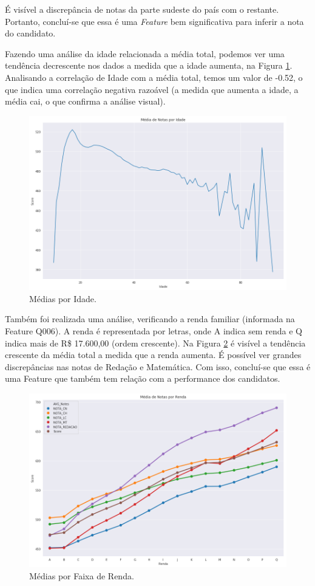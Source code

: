 \documentclass{article}
\begin{document}
É visível a discrepância de notas da parte sudeste do país com o restante. Portanto, concluí-se que essa é uma \emph{Feature} bem significativa para inferir a nota do candidato.

Fazendo uma análise da idade relacionada a média total, podemos ver uma tendência decrescente nos dados a medida que a idade aumenta, na Figura \ref{fig:mean_by_age}. Analisando a correlação de Idade com a média total, temos um valor de -0.52, o que indica uma correlação negativa razoável (a medida que aumenta a idade, a média cai, o que confirma a análise visual).

\begin{figure}[H]
\centering
  \includegraphics[width=0.8 \linewidth]{img/mean_by_age.png}
  \caption{Médias por Idade.}
  \label{fig:mean_by_age}
\end{figure}

Também foi realizada uma análise, verificando a renda familiar (informada na Feature Q006). A renda é representada por letras, onde A indica sem renda e Q indica mais de R\$ 17.600,00 (ordem crescente). Na Figura \ref{fig:mean_by_wage} é visível a tendência crescente da média total a medida que a renda aumenta. É possível ver grandes discrepâncias nas notas de Redação e Matemática. Com isso, concluí-se que essa é uma Feature que também tem relação com a performance dos candidatos.

\begin{figure}[H]
\centering
  \includegraphics[width=0.8 \linewidth]{img/mean_by_wage.png}
  \caption{Médias por Faixa de Renda.}
  \label{fig:mean_by_wage}
\end{figure}
\end{document}
